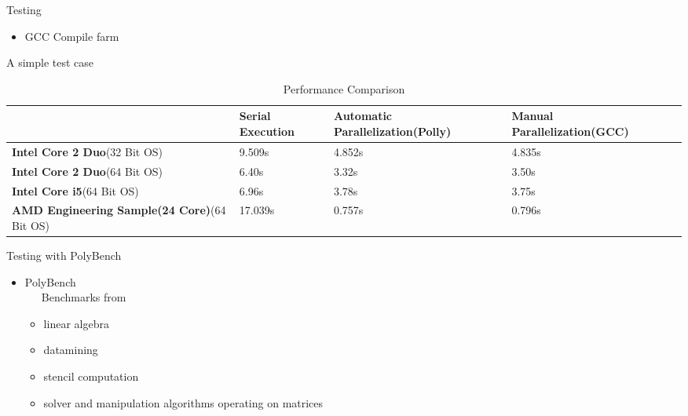 \documentclass{beamer}
\begin{document}
\begin{frame}[shrink]{Testing}
\begin{itemize}
\item GCC Compile farm
\end{itemize}

\pause

\begin{block}{A simple test case}
{\tiny }
\end{block}
\pause
\begin{table}[h]
\begin{center}
{\footnotesize
\begin{tabular}{| l | p{2cm} | p{2cm} | p{2cm} | p{2cm} |}
\hline
& \textbf{Serial Execution} & \textbf{Automatic Parallelization(Polly)} & \textbf{Manual Parallelization(GCC)} \\ \hline
\textbf{Intel Core 2 Duo}(32 Bit OS)& 9.509s & 4.852s & 4.835s \\ \hline
\textbf{Intel Core 2 Duo}(64 Bit OS)& 6.40s  & 3.32s & 3.50s\\ \hline
\textbf{Intel Core i5}(64 Bit OS)   & 6.96s  & 3.78s & 3.75s\\ \hline
\textbf{AMD Engineering Sample(24 Core)}(64 Bit OS)   & 17.039s & 0.757s & 0.796s\\
\hline
\end{tabular}
}
\end{center}
\caption{Performance Comparison}
\end{table}


\end{frame}
\begin{frame}{Testing with PolyBench}
\begin{itemize}
\item PolyBench \\
	\ \ \ Benchmarks from
	\begin{itemize}
	\item linear algebra
	\item datamining
	\item stencil computation
	\item solver and manipulation algorithms operating on matrices
	\end{itemize}
\end{itemize}
\end{frame}
\end{document}
